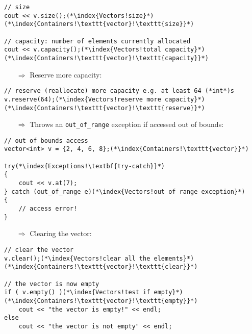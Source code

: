\documentclass[10pt]{article}
\begin{document}
\begin{lstlisting}
// size
cout << v.size();(*\index{Vectors!size}*)(*\index{Containers!\texttt{vector}!\texttt{size}}*)

// capacity: number of elements currently allocated
cout << v.capacity();(*\index{Vectors!total capacity}*)(*\index{Containers!\texttt{vector}!\texttt{capacity}}*)
\end{lstlisting}
\begin{enumerate}
\item[$\Rightarrow$] Reserve more capacity:
\end{enumerate}
\begin{lstlisting}
// reserve (reallocate) more capacity e.g. at least 64 (*int*)s
v.reserve(64);(*\index{Vectors!reserve more capacity}*)(*\index{Containers!\texttt{vector}!\texttt{reserve}}*)
\end{lstlisting}
\begin{enumerate}
\item[$\Rightarrow$] Throws an \texttt{out\_of\_range} exception if accessed out of bounds:
\end{enumerate}
\begin{lstlisting}
// out of bounds access
vector<int> v = {2, 4, 6, 8};(*\index{Containers!\texttt{vector}}*)

try(*\index{Exceptions!\textbf{try-catch}}*)
{
    cout << v.at(7);
} catch (out_of_range e)(*\index{Vectors!out of range exception}*)
{
    // access error!
}
\end{lstlisting}
\begin{enumerate}
\item[$\Rightarrow$] Clearing the vector:
\end{enumerate}
\begin{lstlisting}
// clear the vector
v.clear();(*\index{Vectors!clear all the elements}*)(*\index{Containers!\texttt{vector}!\texttt{clear}}*)

// the vector is now empty
if ( v.empty() )(*\index{Vectors!test if empty}*)(*\index{Containers!\texttt{vector}!\texttt{empty}}*)
    cout << "the vector is empty!" << endl;
else
    cout << "the vector is not empty" << endl;
\end{lstlisting}
%
%
\end{document}
